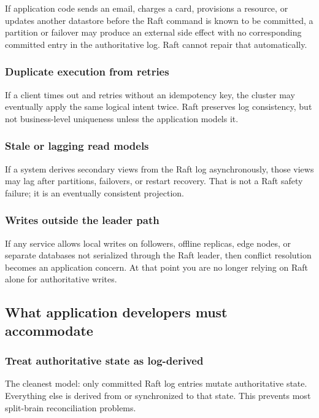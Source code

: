 If application code sends an email, charges a card, provisions a resource,
or updates another datastore before the Raft command is known to be
committed, a partition or failover may produce an external side effect
with no corresponding committed entry in the authoritative log. Raft
cannot repair that automatically.

\subsubsection{Duplicate execution from retries}

If a client times out and retries without an idempotency key, the cluster
may eventually apply the same logical intent twice. Raft preserves log
consistency, but not business-level uniqueness unless the application
models it.

\subsubsection{Stale or lagging read models}

If a system derives secondary views from the Raft log asynchronously,
those views may lag after partitions, failovers, or restart recovery.
That is not a Raft safety failure; it is an eventually consistent
projection.

\subsubsection{Writes outside the leader path}

If any service allows local writes on followers, offline replicas, edge
nodes, or separate databases not serialized through the Raft leader, then
conflict resolution becomes an application concern. At that point you are
no longer relying on Raft alone for authoritative writes.

\subsection{What application developers must accommodate}

\subsubsection{Treat authoritative state as log-derived}

The cleanest model: only committed Raft log entries mutate authoritative
state. Everything else is derived from or synchronized to that state.
This prevents most split-brain reconciliation problems.

